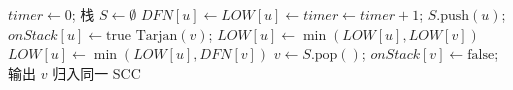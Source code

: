 \begin{algorithm}[H]
\caption{Tarjan SCC 规约}
\begin{algorithmic}[1]
\State $timer\gets0$; 栈 $S\gets\emptyset$
    \State $DFN[u]\gets LOW[u]\gets timer\gets timer+1$; $S.\text{push}(u)$; $onStack[u]\gets\text{true}$
         $\text{Tarjan}(v)$; $LOW[u]\gets\min(LOW[u],LOW[v])$
         $LOW[u]\gets\min(LOW[u],DFN[v])$ \EndIf
    \EndFor
        \Repeat $v\gets S.\text{pop}()$; $onStack[v]\gets\text{false}$; 输出 $v$ 归入同一 SCC 
    \EndIf
\EndProcedure
\end{algorithmic}
\end{algorithm}